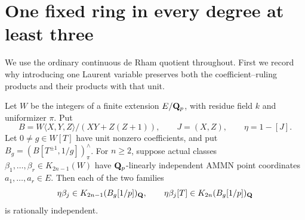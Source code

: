 \section{One fixed ring in every degree at least three}
\label{d3:sec:singlefixedalldegree}

We use the ordinary continuous de Rham quotient throughout.
First we record why introducing one Laurent variable preserves both
the coefficient--ruling products and their products with that unit.

\begin{lemma}\label{d3:lem:onelaurentcoefficientdetector}
Let $W$ be the integers of a finite extension $E/\mathbf Q_p$, with
residue field $k$ and uniformizer $\pi$. Put
\[
 B=W\langle X,Y,Z\rangle/(XY+Z(Z+1)),\qquad
 J=(X,Z),\qquad \eta=1-[J].
\]
Let $0\ne g\in W[T]$ have unit nonzero coefficients, and put
$B_g=(B[T^{\pm1},1/g])^\wedge_\pi$.
For $n\geq2$, suppose actual classes
$\beta_1,\ldots,\beta_r\in K_{2n-1}(W)$ have
$\mathbf Q_p$-linearly independent AMMN point coordinates
$a_1,\ldots,a_r\in E$.
Then each of the two families
\[
 \eta\beta_j\in K_{2n-1}(B_g[1/p])_{\mathbf Q},\qquad
 \eta\beta_j[T]\in K_{2n}(B_g[1/p])_{\mathbf Q}
\]
is rationally independent.
\end{lemma}

